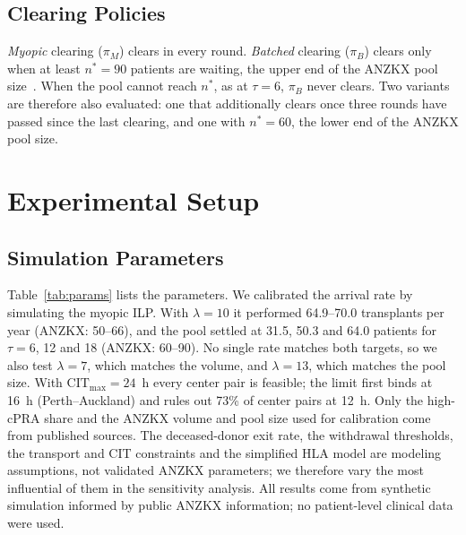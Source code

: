 \documentclass[journal]{IEEEtran}
\newcommand{\cit}{\ensuremath{\mathrm{CIT}}}
\begin{document}
\subsection{Clearing Policies}
\label{sec:method:clearing}

\emph{Myopic} clearing ($\pi_M$) clears in every round.
\emph{Batched} clearing ($\pi_B$) clears only when at least
$n^{*} = 90$ patients are waiting, the upper end of the ANZKX pool
size~\cite{ANZKX2021}.
When the pool cannot reach $n^{*}$, as at $\tau = 6$, $\pi_B$ never
clears.
Two variants are therefore also evaluated: one that additionally clears
once three rounds have passed since the last clearing, and one with
$n^{*} = 60$, the lower end of the ANZKX pool size.

\section{Experimental Setup}
\label{sec:experiments}

\subsection{Simulation Parameters}
\label{sec:exp:pool}

Table~\ref{tab:params} lists the parameters. We calibrated the
arrival rate by simulating the myopic ILP. With $\lambda = 10$ it
performed 64.9--70.0 transplants per year (ANZKX: 50--66), and the
pool settled at 31.5, 50.3 and 64.0 patients for $\tau = 6$, 12 and 18
(ANZKX: 60--90). No single rate matches both targets, so we also test
$\lambda = 7$, which matches the volume, and $\lambda = 13$, which
matches the pool size. With $\cit_{\max} = 24$~h every center pair is
feasible; the limit first binds at 16~h (Perth--Auckland) and rules
out 73\% of center pairs at 12~h.
Only the high-cPRA share and the ANZKX volume and pool size used for
calibration come from published sources. The deceased-donor exit
rate, the withdrawal thresholds, the transport and CIT constraints and
the simplified HLA model are modeling assumptions, not validated ANZKX
parameters; we therefore vary the most influential of them in the
sensitivity analysis. All results come from synthetic simulation
informed by public ANZKX information; no patient-level clinical data
were used.
\end{document}
